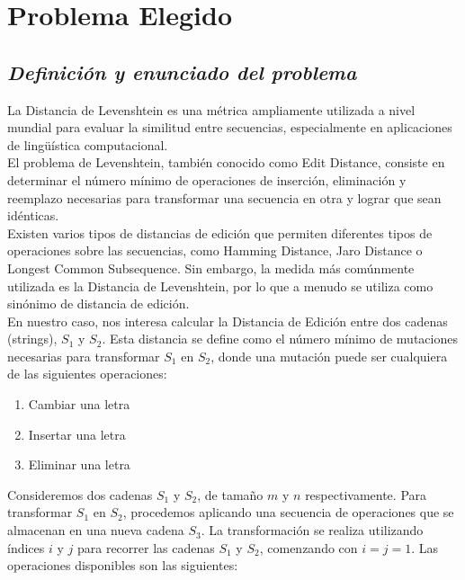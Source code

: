 \section{Problema Elegido}

\subsection{\textit{\textbf{Definición y enunciado del problema}}}

La Distancia de Levenshtein es una métrica ampliamente utilizada a nivel mundial para evaluar la similitud entre secuencias, especialmente en aplicaciones de lingüística computacional.\\

El problema de Levenshtein, también conocido como Edit Distance, consiste en determinar el número mínimo de operaciones de inserción, eliminación y reemplazo necesarias para transformar una secuencia en otra y lograr que sean idénticas. \\

Existen varios tipos de distancias de edición que permiten diferentes tipos de operaciones sobre las secuencias, como Hamming Distance, Jaro Distance o Longest Common Subsequence. Sin embargo, la medida más comúnmente utilizada es la Distancia de Levenshtein, por lo que a menudo se utiliza como sinónimo de distancia de edición.\\

En nuestro caso, nos interesa calcular la Distancia de Edición entre dos cadenas (strings), \(S_{1}\) y \(S_{2}\). Esta distancia se define como el número mínimo de mutaciones necesarias para transformar \(S_{1}\) en \(S_{2}\), donde una mutación puede ser cualquiera de las siguientes operaciones:
\begin{enumerate}
    \item Cambiar una letra
    \item Insertar una letra
    \item Eliminar una letra
\end{enumerate}

Consideremos dos cadenas \(S_{1}\) y \(S_{2}\), de tamaño \(m\) y \(n\) respectivamente. Para transformar \(S_{1}\) en \(S_{2}\), procedemos aplicando una secuencia de operaciones que se almacenan en una nueva cadena \(S_{3}\). La transformación se realiza utilizando índices \(i\) y \(j\) para recorrer las cadenas \(S_{1}\) y \(S_{2}\), comenzando con \(i=j=1\). Las operaciones disponibles son las siguientes:

